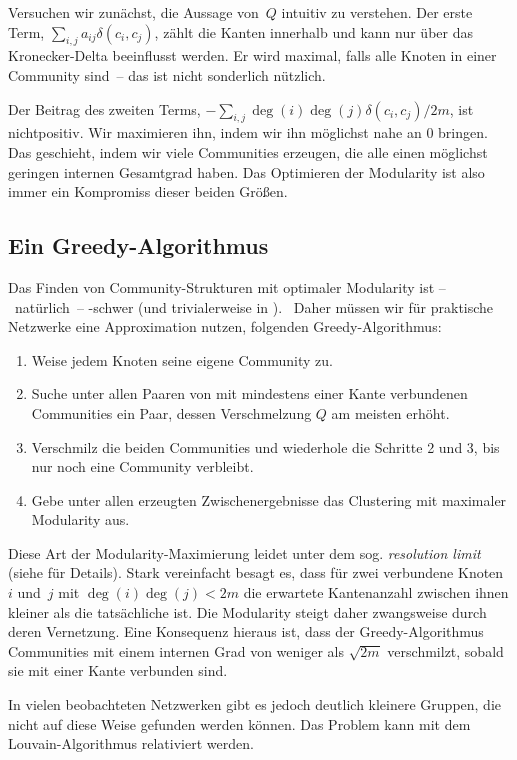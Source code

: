 Versuchen wir zunächst, die Aussage von~$Q$ intuitiv zu verstehen.
Der erste Term, \dh $\sum_{i,j} a_{ij} \delta(c_i, c_j)$, zählt die Kanten innerhalb und kann nur über das Kronecker-Delta beeinflusst werden.
Er wird maximal, falls alle Knoten in einer Community sind~-- das ist nicht sonderlich nützlich.

Der Beitrag des zweiten Terms, \dh $-\sum_{i,j} \deg(i)\deg(j) \delta(c_i, c_j)/2m$, ist nichtpositiv.
Wir maximieren ihn, indem wir ihn möglichst nahe an $0$ bringen.
Das geschieht, indem wir viele Communities erzeugen, die alle einen möglichst geringen internen Gesamtgrad haben.
Das Optimieren der Modularity ist also immer ein Kompromiss dieser beiden Größen.

\subsection{Ein Greedy-Algorithmus}
Das Finden von Community-Strukturen mit optimaler Modularity ist --~natürlich~-- \NP-schwer (und trivialerweise in \NP).~\cite{DBLP:journals/tkde/BrandesDGGHNW08}
Daher müssen wir für praktische Netzwerke eine Approximation nutzen, \zB folgenden Greedy-Algorithmus:

\begin{enumerate}
    \item Weise jedem Knoten seine eigene Community zu.
    \item Suche unter allen Paaren von mit mindestens einer Kante verbundenen Communities ein Paar, dessen Verschmelzung $Q$ am meisten erhöht.
    \item Verschmilz die beiden Communities und wiederhole die Schritte 2 und 3, bis nur noch eine Community verbleibt.
    \item Gebe unter allen erzeugten Zwischenergebnisse das Clustering mit maximaler Modularity aus.
\end{enumerate}

Diese Art der Modularity-Maximierung leidet unter dem sog. \emph{resolution limit} (siehe \cite{barabasi2014network} für Details).
Stark vereinfacht besagt es, dass für zwei verbundene Knoten $i$ und~$j$ mit $\deg(i) \deg(j) < 2m$ die erwartete Kantenanzahl zwischen ihnen kleiner als die tatsächliche ist.
Die Modularity steigt daher zwangsweise durch deren Vernetzung.
Eine Konsequenz hieraus ist, dass der Greedy-Algorithmus Communities mit einem internen Grad von weniger als $\sqrt{2m}$ verschmilzt, sobald sie mit einer Kante verbunden sind.

In vielen beobachteten Netzwerken gibt es jedoch deutlich kleinere Gruppen, die nicht auf diese Weise gefunden werden können.
Das Problem kann \zB mit dem Louvain-Algorithmus relativiert werden.
